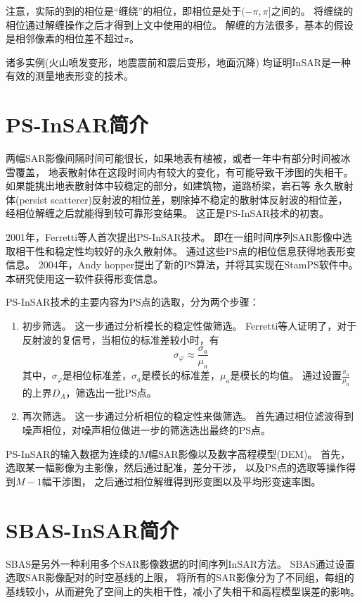 注意，实际的到的相位是“缠绕”的相位，即相位是处于$(-\pi,\pi]$之间的。
将缠绕的相位通过解缠操作之后才得到上文中使用的相位。
解缠的方法很多，基本的假设是相邻像素的相位差不超过$\pi$。

诸多实例(火山喷发变形，地震震前和震后变形，地面沉降)
均证明InSAR是一种有效的测量地表形变的技术。
\section{PS-InSAR简介}

两幅SAR影像间隔时间可能很长，如果地表有植被，或者一年中有部分时间被冰雪覆盖，
地表散射体在这段时间内有较大的变化，有可能导致干涉图的失相干。
如果能挑出地表散射体中较稳定的部分，如建筑物，道路桥梁，岩石等
永久散射体(persist scatterer)反射波的相位差，剔除掉不稳定的散射体反射波的相位差，
经相位解缠之后就能得到较可靠形变结果。
这正是PS-InSAR技术的初衷。

2001年，Ferretti等人首次提出PS-InSAR技术。
即在一组时间序列SAR影像中选取相干性和稳定性均较好的永久散射体。
通过这些PS点的相位信息获得地表形变信息。
2004年，Andy hopper提出了新的PS算法，并将其实现在StamPS软件中。
本研究使用这一软件获得形变信息。

PS-InSAR技术的主要内容为PS点的选取，分为两个步骤：
\begin{enumerate}
    \item 初步筛选。
    这一步通过分析模长的稳定性做筛选。
    Ferretti等人证明了，对于反射波的复信号，当相位的标准差较小时，有
    \begin{equation}
        \sigma_\varphi \approx \frac{\sigma_a}{\mu_a}
    \end{equation}
    其中，$\sigma_\varphi$是相位标准差，$\sigma_a$是模长的标准差，$\mu_a$是模长的均值。
    通过设置$\frac{\sigma_a}{\mu_a}$的上界$D_A$，筛选出一批PS点。
    \item 再次筛选。
    这一步通过分析相位的稳定性来做筛选。
    首先通过相位滤波得到噪声相位，对噪声相位做进一步的筛选选出最终的PS点。
\end{enumerate}

PS-InSAR的输入数据为连续的$M$幅SAR影像以及数字高程模型(DEM)。
首先，选取某一幅影像为主影像，然后通过配准，差分干涉，
以及PS点的选取等操作得到$M-1$幅干涉图，
之后通过相位解缠得到形变图以及平均形变速率图。

\section{SBAS-InSAR简介}
SBAS是另外一种利用多个SAR影像数据的时间序列InSAR方法。
SBAS通过设置选取SAR影像配对的时空基线的上限，
将所有的SAR影像分为了不同组，每组的基线较小，从而避免了空间上的失相干性，减小了失相干和高程模型误差的影响。

